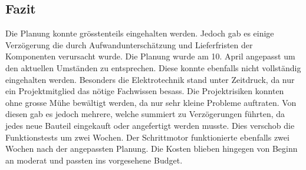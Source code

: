 \subsection{Fazit}

Die Planung konnte grösstenteils eingehalten werden. Jedoch gab es einige Verzögerung die durch Aufwandunterschätzung und Lieferfristen der Komponenten verursacht wurde. Die Planung wurde am 10. April angepasst um den aktuellen Umständen zu entsprechen. Diese konnte ebenfalls nicht vollständig eingehalten werden. Besonders die Elektrotechnik stand unter Zeitdruck, da nur ein Projektmitglied das nötige Fachwissen besass.
Die Projektrisiken konnten ohne grosse Mühe bewältigt werden, da nur sehr kleine Probleme auftraten.
Von diesen gab es jedoch mehrere, welche summiert zu Verzögerungen führten, da jedes neue Bauteil eingekauft oder angefertigt werden musste. Dies verschob die Funktionstests um zwei Wochen.
Der Schrittmotor funktionierte ebenfalls zwei Wochen nach der angepassten Planung.
Die Kosten blieben hingegen von Beginn an moderat und passten ins vorgesehene Budget.
